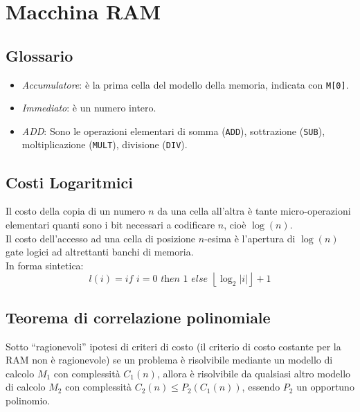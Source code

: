 \documentclass[10pt,a4paper]{article}
\newcommand{\code}{\texttt}
\begin{document}
\section*{Macchina RAM}
\begin{multicols*}{2}
\subsection*{Glossario}
\begin{itemize}
    \item\textit{Accumulatore}: \`e la prima cella del modello della memoria, indicata con \code{M[0]}.
    \item\textit{Immediato}: \`e un numero intero.
    \item\textit{ADD}: Sono le operazioni elementari di somma (\code{ADD}), sottrazione (\code{SUB}), moltiplicazione (\code{MULT}), divisione (\code{DIV}).
\end{itemize}
\subsection*{Costi Logaritmici}
Il costo della copia di un numero $n$ da una cella all'altra \`e tante micro-operazioni elementari quanti sono i bit necessari a codificare $n$, cio\`e $\log(n)$.\\
Il costo dell'accesso ad una cella di posizione $n$-esima \`e l'apertura di $\log(n)$ gate logici ad altrettanti banchi di memoria.\\
In forma sintetica:
\begin{equation*}
    l(i) = \textit{if } i=0 \textit{ then } 1
    \textit{ else } \left\lfloor\log_2|i|\right\rfloor + 1
\end{equation*}

\subsection*{Teorema di correlazione polinomiale}
Sotto ``ragionevoli'' ipotesi di criteri di costo (il criterio di costo costante per la RAM non \`e ragionevole) se un problema \`e risolvibile mediante un modello di calcolo $M_1$ con complessit\`a $C_1(n)$, allora \`e risolvibile da qualsiasi altro modello di calcolo $M_2$ con complessit\`a $C_2(n) \le P_2(C_1(n))$, essendo $P_2$ un opportuno polinomio.
\end{multicols*}
\end{document}
